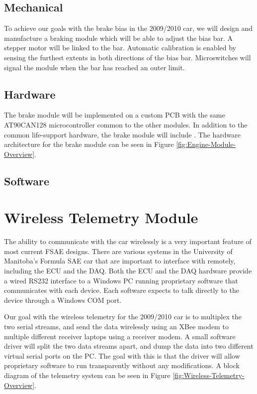 \subsection{Mechanical}

To achieve our goals with the brake bias in the 2009/2010 car, we will design and manufacture a braking module which will be able to adjust the bias bar. A stepper motor will be linked to the bar. Automatic calibration is enabled by sensing the furthest extents in both directions of the bias bar. Microswitches will signal the module when the bar has reached an outer limit.

\subsection{Hardware}

The brake module will be implemented on a custom PCB with the same AT90CAN128 microcontroller common to the other modules. In addition to the common life-support hardware, the brake module will include . The hardware architecture for the brake module can be seen in Figure \ref{fig:Engine-Module-Overview}.

\subsection{Software}

%
%
\section{Wireless Telemetry Module}

The ability to communicate with the car wirelessly is a very important feature of most current FSAE designs. There are various systems in the University of Manitoba's Formula SAE car that are important to interface with remotely, including the ECU and the DAQ. Both the ECU and the DAQ hardware provide a wired RS232 interface to a Windows PC running proprietary software that communicates with each device. Each software expects to talk directly to the device through a Windows COM port.

Our goal with the wireless telemetry for the 2009/2010 car is to multiplex the two serial streams, and send the data wirelessly using an XBee modem to multiple different receiver laptops using a receiver modem. A small software driver will split the two data streams apart, and dump the data into two different virtual serial ports on the PC. The goal with this is that the driver will allow proprietary software to run transparently without any modifications. A block diagram of the telemetry system can be seen in Figure \ref{fig:Wireless-Telemetry-Overview}.

